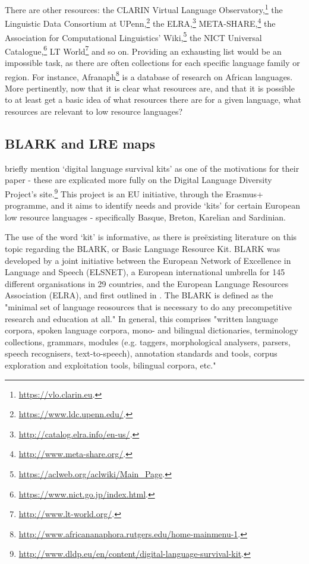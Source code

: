 There are other resources: the CLARIN Virtual Language Observatory,\footnote{\href{https://vlo.clarin.eu}{https://vlo.clarin.eu}. } the Linguistic Data Consortium at UPenn,\footnote{\href{https://www.ldc.upenn.edu/}{https://www.ldc.upenn.edu/}. } the ELRA,\footnote{\href{http://catalog.elra.info/en-us/}{http://catalog.elra.info/en-us/}. } META-SHARE,\footnote{\href{http://www.meta-share.org/}{http://www.meta-share.org/}. } the Association for Computational Linguistics' Wiki,\footnote{\href{https://aclweb.org/aclwiki/Main_Page}{https://aclweb.org/aclwiki/Main_Page}. } the NICT Universal Catalogue,\footnote{\href{https://www.nict.go.jp/index.html}{https://www.nict.go.jp/index.html}. } LT World\footnote{\href{http://www.lt-world.org/}{http://www.lt-world.org/}. } and so on. Providing an exhausting list would be an impossible task, as there are often collections for each specific language family or region. For instance, Afranaph\footnote{\href{http://www.africananaphora.rutgers.edu/home-mainmenu-1}{http://www.africananaphora.rutgers.edu/home-mainmenu-1}. } is a database of research on African languages. More pertinently, now that it is clear what resources are, and that it is possible to at least get a basic idea of what resources there are for a given language, what resources are relevant to low resource languages?

\subsection{BLARK and LRE maps}
\label{subsec:blark-and-lre-maps}

\citet{soria2017digital} briefly mention `digital language survival kits' as one of the motivations for their paper - these are explicated more fully on the Digital Language Diversity Project's site.\footnote{\href{http://www.dldp.eu/en/content/digital-language-survival-kit}{http://www.dldp.eu/en/content/digital-language-survival-kit}. } This project is an EU initiative, through the Erasmus+ programme, and it aims to identify needs and provide `kits' for certain European low resource languages - specifically Basque, Breton, Karelian and Sardinian.

The use of the word `kit' is informative, as there is  pre\"{e}xisting literature on this topic regarding the BLARK, or Basic Language Resource Kit. BLARK was developed by a joint initiative between the European Network of Excellence in Language and Speech (ELSNET), a European international umbrella for 145 different organisations in 29 countries, and the European Language Resources Association (ELRA), and first outlined in \citet{krauwer1998elsnet}. The BLARK is defined as the "minimal set of language reosources that is necessary to do any precompetitive research and education at all." \citep[4]{krauwer2003basic} In general, this comprises "written language corpora, spoken language corpora, mono- and bilingual dictionaries, terminology collections, grammars, modules (e.g. taggers, morphological analysers, parsers, speech recognisers, text-to-speech), annotation standards and tools, corpus exploration and exploitation tools, bilingual corpora, etc."

